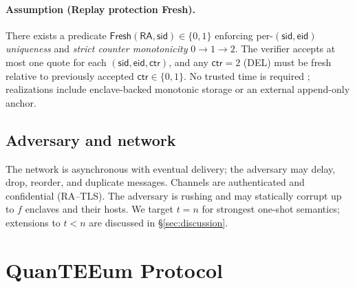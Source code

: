 \documentclass[runningheads,orivec]{llncs}
\newcommand{\prot}{\textsf{QuanTEEum}}
\begin{document}
\paragraph{Assumption (Replay protection \textsf{Fresh}).}
There exists a predicate $\textsf{Fresh}(\mathsf{RA},\mathsf{sid})\!\in\!\{0,1\}$ enforcing per-$(\mathsf{sid},\mathsf{eid})$ \emph{uniqueness} and \emph{strict counter monotonicity} $0\!\rightarrow\!1\!\rightarrow\!2$. The verifier accepts at most one quote for each $(\mathsf{sid},\mathsf{eid},\mathsf{ctr})$, and any $\mathsf{ctr}{=}2$ (DEL) must be fresh relative to previously accepted $\mathsf{ctr}\in\{0,1\}$. No trusted time is required \cite{alder2023time}; realizations include enclave-backed monotonic storage or an external append-only anchor.

\subsection{Adversary and network}
The network is asynchronous with eventual delivery; the adversary may delay, drop, reorder, and duplicate messages. Channels are authenticated and confidential (RA--TLS). The adversary is rushing and may statically corrupt up to $f$ enclaves and their hosts. We target $t{=}n$ for strongest one-shot semantics; extensions to $t<n$ are discussed in \S\ref{sec:discussion}.

\section{\prot{} Protocol}\label{sec:protocol}
\end{document}
